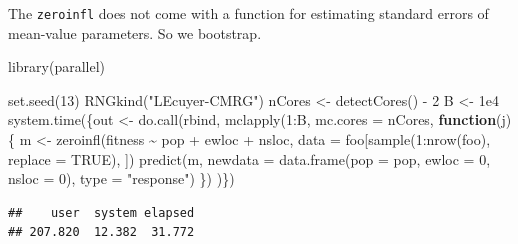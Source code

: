 \documentclass[
  ignorenonframetext,
]{beamer}
\newenvironment{Shaded}{\begin{snugshade}}{\end{snugshade}}
\newcommand{\AttributeTok}[1]{\textcolor[rgb]{0.77,0.63,0.00}{#1}}
\newcommand{\ConstantTok}[1]{\textcolor[rgb]{0.00,0.00,0.00}{#1}}
\newcommand{\ControlFlowTok}[1]{\textcolor[rgb]{0.13,0.29,0.53}{\textbf{#1}}}
\newcommand{\DecValTok}[1]{\textcolor[rgb]{0.00,0.00,0.81}{#1}}
\newcommand{\FloatTok}[1]{\textcolor[rgb]{0.00,0.00,0.81}{#1}}
\newcommand{\FunctionTok}[1]{\textcolor[rgb]{0.00,0.00,0.00}{#1}}
\newcommand{\NormalTok}[1]{#1}
\newcommand{\OtherTok}[1]{\textcolor[rgb]{0.56,0.35,0.01}{#1}}
\newcommand{\SpecialCharTok}[1]{\textcolor[rgb]{0.00,0.00,0.00}{#1}}
\newcommand{\StringTok}[1]{\textcolor[rgb]{0.31,0.60,0.02}{#1}}
\begin{document}
\begin{frame}[fragile]{}
\protect\hypertarget{section-44}{}
The \texttt{zeroinfl} does not come with a function for estimating
standard errors of mean-value parameters. So we bootstrap.

\vspace{12pt}
\tiny

\begin{Shaded}
\begin{Highlighting}[]
\FunctionTok{library}\NormalTok{(parallel)}
\end{Highlighting}
\end{Shaded}

\begin{Shaded}
\begin{Highlighting}[]
\FunctionTok{set.seed}\NormalTok{(}\DecValTok{13}\NormalTok{)}
\FunctionTok{RNGkind}\NormalTok{(}\StringTok{"L\textquotesingle{}Ecuyer{-}CMRG"}\NormalTok{)}
\NormalTok{nCores }\OtherTok{\textless{}{-}} \FunctionTok{detectCores}\NormalTok{() }\SpecialCharTok{{-}} \DecValTok{2}
\NormalTok{B }\OtherTok{\textless{}{-}} \FloatTok{1e4}
\FunctionTok{system.time}\NormalTok{(\{out }\OtherTok{\textless{}{-}} \FunctionTok{do.call}\NormalTok{(rbind, }\FunctionTok{mclapply}\NormalTok{(}\DecValTok{1}\SpecialCharTok{:}\NormalTok{B, }\AttributeTok{mc.cores =}\NormalTok{ nCores, }
                               \ControlFlowTok{function}\NormalTok{(j)\{}
\NormalTok{    m }\OtherTok{\textless{}{-}} \FunctionTok{zeroinfl}\NormalTok{(fitness }\SpecialCharTok{\textasciitilde{}}\NormalTok{ pop }\SpecialCharTok{+}\NormalTok{ ewloc }\SpecialCharTok{+}\NormalTok{ nsloc, }
                  \AttributeTok{data =}\NormalTok{ foo[}\FunctionTok{sample}\NormalTok{(}\DecValTok{1}\SpecialCharTok{:}\FunctionTok{nrow}\NormalTok{(foo), }\AttributeTok{replace =} \ConstantTok{TRUE}\NormalTok{), ])}
    \FunctionTok{predict}\NormalTok{(m, }\AttributeTok{newdata =} \FunctionTok{data.frame}\NormalTok{(}\AttributeTok{pop =}\NormalTok{ pop, }\AttributeTok{ewloc =} \DecValTok{0}\NormalTok{, }\AttributeTok{nsloc =} \DecValTok{0}\NormalTok{), }
            \AttributeTok{type =} \StringTok{"response"}\NormalTok{)}
\NormalTok{  \})}
\NormalTok{)\})}
\end{Highlighting}
\end{Shaded}

\begin{verbatim}
##    user  system elapsed 
## 207.820  12.382  31.772
\end{verbatim}
\end{frame}
\end{document}
